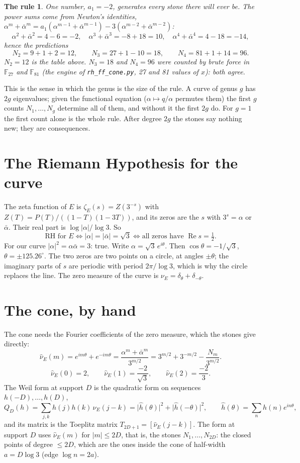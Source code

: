 \documentclass[11pt]{article}
\newtheorem*{rule*}{The rule}
\newcommand{\F}{\mathbb F}
\newcommand{\abar}{\bar\alpha}
\begin{document}
\begin{rule*}
One number, $a_1=-2$, generates every stone there will ever be. The power sums come from Newton's identities, $\alpha^m+\abar^m=a_1(\alpha^{m-1}+\abar^{m-1})-3(\alpha^{m-2}+\abar^{m-2})$:
\[
\alpha^2+\abar^2=4-6=-2,\quad \alpha^3+\abar^3=-8+18=10,\quad \alpha^4+\abar^4=4-18=-14,
\]
hence the predictions
\[
N_2=9+1+2=12,\qquad N_3=27+1-10=18,\qquad N_4=81+1+14=96 .
\]
$N_2=12$ is the table above. $N_3=18$ and $N_4=96$ were counted by brute force in $\F_{27}$ and $\F_{81}$ (the engine of \texttt{rh\_ff\_cone.py}, 27 and 81 values of $x$): both agree.
\end{rule*}

This is the sense in which the genus is the size of the rule. A curve of genus $g$ has $2g$ eigenvalues; given the functional equation ($\alpha\mapsto q/\alpha$ permutes them) the first $g$ counts $N_1,\dots,N_g$ determine all of them, and without it the first $2g$ do. For $g=1$ the first count alone is the whole rule. After degree $2g$ the stones say nothing new; they are consequences.

\section{The Riemann Hypothesis for the curve}

The zeta function of $E$ is $\zeta_E(s)=Z(3^{-s})$ with $Z(T)=P(T)/((1-T)(1-3T))$, and its zeros are the $s$ with $3^{s}=\alpha$ or $\abar$. Their real part is $\log|\alpha|/\log3$. So
\[
\text{RH for }E\iff|\alpha|=|\abar|=\sqrt3\iff\text{all zeros have }\operatorname{Re}s=\tfrac12 .
\]
For our curve $|\alpha|^2=\alpha\abar=3$: true. Write $\alpha=\sqrt3\,e^{i\theta}$. Then $\cos\theta=-1/\sqrt3$, $\theta=\pm125.26^\circ$. The two zeros are two points on a circle, at angles $\pm\theta$; the imaginary parts of $s$ are periodic with period $2\pi/\log3$, which is why the circle replaces the line. The zero measure of the curve is $\nu_E=\delta_\theta+\delta_{-\theta}$.

\section{The cone, by hand}

The cone needs the Fourier coefficients of the zero measure, which the stones give directly:
\[
\hat\nu_E(m)=e^{im\theta}+e^{-im\theta}=\frac{\alpha^m+\abar^m}{3^{m/2}}=3^{m/2}+3^{-m/2}-\frac{N_m}{3^{m/2}} .
\]
\[
\hat\nu_E(0)=2,\qquad \hat\nu_E(1)=\frac{-2}{\sqrt3},\qquad \hat\nu_E(2)=\frac{-2}{3}.
\]
The Weil form at support $D$ is the quadratic form on sequences $h(-D),\dots,h(D)$,
\[
Q_D(h)=\sum_{j,k}h(j)h(k)\,\hat\nu_E(j-k)=\big|\hat h(\theta)\big|^2+\big|\hat h(-\theta)\big|^2,\qquad \hat h(\theta)=\sum_n h(n)e^{in\theta},
\]
and its matrix is the Toeplitz matrix $T_{2D+1}=[\hat\nu_E(j-k)]$. The form at support $D$ uses $\hat\nu_E(m)$ for $|m|\le2D$, that is, the stones $N_1,\dots,N_{2D}$: the closed points of degree $\le2D$, which are the ones inside the cone of half-width $a=D\log3$ (edge $\log n=2a$).
\end{document}

